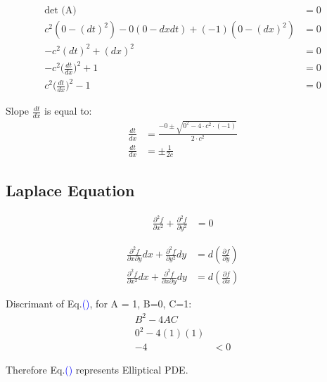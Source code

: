 \documentclass[fleqn,10pt]{SelfArx} %
\newcommand{\myeqref}[1]{Eq.\textcolor{blue}{\textup{(\getrefnumber{#1})}}}
\begin{document}
\begin{align*}
	\text{det (A)}                             & = 0 \\
	c^2(0-(dt)^2) - 0(0-dxdt) + (-1)(0-(dx)^2) & = 0 \\
	-c^2(dt)^2 + (dx)^2                        & = 0 \\
	-c^2\Big(\frac{dt}{dx}\Big)^2 + 1          & = 0 \\
	c^2\Big(\frac{dt}{dx}\Big)^2 - 1           & = 0
\end{align*}

Slope $\frac{dt}{dx}$ is equal to:
\begin{align*}
	\frac{dt}{dx} & = \frac{-0 \pm \sqrt{0^2 -4 \cdot c^2\cdot (-1)}}{2\cdot c^2} \\
	\frac{dt}{dx} & = \pm \frac{1}{2c}
\end{align*}

\subsection{Laplace Equation}
\begin{align*}
	\frac{\partial^2 f}{\partial x^2} + \frac{\partial^2 f}{\partial y^2}           &= 0 \tag{8.7} \label{eq:8.7}
\end{align*}


\begin{align*}
	\frac{\partial^2 f}{\partial x \partial y}dx + \frac{\partial^2 f}{\partial y^2}dy &= d\left(\frac{\partial f}{\partial y}\right) \tag{8.8} \label{eq:8.8} \\
	\frac{\partial^2 f}{\partial x^2}dx + \frac{\partial^2 f}{\partial x \partial y}dy &= d\left(\frac{\partial f}{\partial x}\right) \tag{8.9} \label{eq:8.0}
\end{align*}

Discrimant of \myeqref{eq:8.7}, for A = 1, B=0, C=1:
\begin{align*}
	B^2 - 4AC     &    \\
	0^2 - 4(1)(1) &    \\
	-4            & <0
\end{align*}

Therefore \myeqref{eq:8.7} represents Elliptical PDE.
\end{document}
